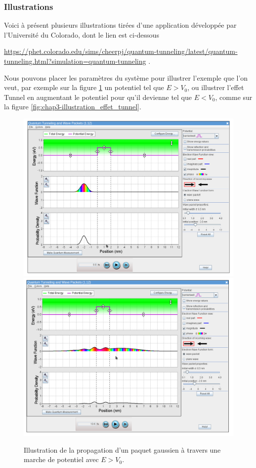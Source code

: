 \documentclass{book}
\begin{document}
\subsubsection{Illustrations}
Voici à présent plusieurs illustrations tirées d'une application développée par l'Université du Colorado, dont le lien est ci-dessous 
\begin{center}
  \href{https://phet.colorado.edu/sims/cheerpj/quantum-tunneling/latest/quantum-tunneling.html?simulation=quantum-tunneling}{https://phet.colorado.edu/sims/cheerpj/quantum-tunneling/latest/quantum-tunneling.html?simulation=quantum-tunneling} .
\end{center}

Nous pouvons placer les paramètres du système pour illustrer l'exemple que l'on veut, par exemple sur la figure \ref{fig:chap3-illustration_marche_potentiel} un potentiel tel que $E>V_0$, ou illustrer l'effet Tunnel en augmentant le potentiel pour qu'il devienne tel que $E<V_0$, comme sur la figure \ref{fig:chap3-illustration_effet_tunnel}.

\begin{figure}
  \centering
  \includegraphics[width=0.9\linewidth]{images/chap3-marche_potentiel.png} \\
  \includegraphics[width=0.9\linewidth]{images/chap3-marche_potentiel-2.png} 
  \caption{Illustration de la propagation d'un paquet gaussien à travers une marche de potentiel avec $E>V_0$.}
  \label{fig:chap3-illustration_marche_potentiel}
\end{figure} 
\end{document}
